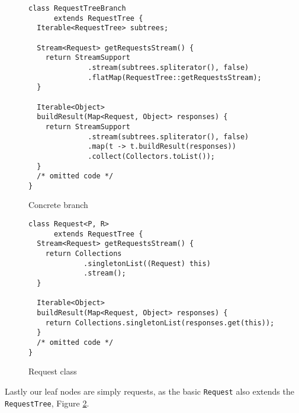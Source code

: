 \begin{figure}[h]

\begin{verbatim}
class RequestTreeBranch
      extends RequestTree {
  Iterable<RequestTree> subtrees;

  Stream<Request> getRequestsStream() {
    return StreamSupport
              .stream(subtrees.spliterator(), false)
              .flatMap(RequestTree::getRequestsStream);
  }

  Iterable<Object>
  buildResult(Map<Request, Object> responses) {
    return StreamSupport
              .stream(subtrees.spliterator(), false)
              .map(t -> t.buildResult(responses))
              .collect(Collectors.toList());
  }
  /* omitted code */
}
\end{verbatim}
\caption{Concrete branch}
\label{fig:tree-impl-branch}

\end{figure}


\begin{figure}[h]

\begin{verbatim}
class Request<P, R>
      extends RequestTree {
  Stream<Request> getRequestsStream() {
    return Collections
             .singletonList((Request) this)
             .stream();
  }

  Iterable<Object>
  buildResult(Map<Request, Object> responses) {
    return Collections.singletonList(responses.get(this));
  }
  /* omitted code */
}
\end{verbatim}

\caption{Request class}
\label{fig:tree-impl-request-class}
\end{figure}

Lastly our leaf nodes are simply requests, as the basic \texttt{Request} also extends the \texttt{RequestTree}, Figure \ref{fig:tree-impl-request-class}.
